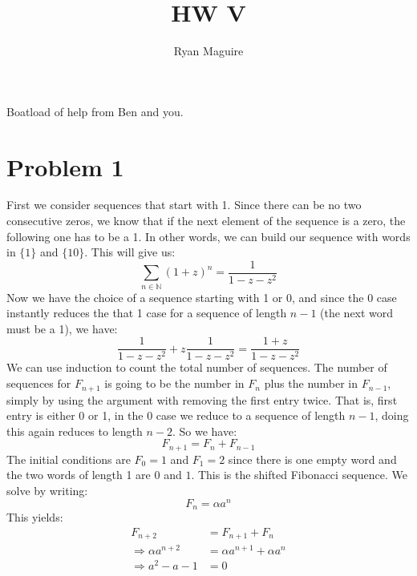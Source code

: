 \documentclass{article}
\title{HW V}
\author{Ryan Maguire}
\date{\vspace{-2ex}}
\begin{document}
    \maketitle
    Boatload of help from Ben and you.
    \section*{Problem 1}
        First we consider sequences that start with 1. Since there can be no two
        consecutive zeros, we know that if the next element of the sequence is a
        zero, the following one has to be a 1. In other words, we can build our
        sequence with words in $\{1\}$ and $\{10\}$. This will give us:
        \begin{equation}
            \sum_{n\in\mathbb{N}}(1+z)^{n}=\frac{1}{1-z-z^{2}}
        \end{equation}
        Now we have the choice of a sequence starting with 1 or 0, and since the 0 case
        instantly reduces the that 1 case for a sequence of length $n-1$ (the next word must
        be a 1), we have:
        \begin{equation}
            \frac{1}{1-z-z^{2}} + z\frac{1}{1-z-z^{2}}=\frac{1+z}{1-z-z^{2}}
        \end{equation}
        We can use induction to count the total number of sequences. The number of sequences
        for $F_{n+1}$ is going to be the number in $F_{n}$ plus the number in
        $F_{n-1}$, simply by using the argument with removing the first entry twice.
        That is, first entry is either 0 or 1, in the 0 case we reduce to a sequence of
        length $n-1$, doing this again reduces to length $n-2$. So we have:
        \begin{equation}
            F_{n+1}=F_{n}+F_{n-1}
        \end{equation}
        The initial conditions are $F_{0}=1$ and $F_{1}=2$ since there is one empty word
        and the two words of length 1 are $0$ and $1$. This is the shifted Fibonacci
        sequence. We solve by writing:
        \begin{equation}
            F_{n}=\alpha{a}^{n}
        \end{equation}
        This yields:
        \begin{subequations}
            \begin{align}
                F_{n+2}&=F_{n+1}+F_{n}\\
                \Rightarrow
                \alpha{a}^{n+2}&=\alpha{a}^{n+1}+\alpha{a}^{n}\\
                \Rightarrow
                a^{2}-a-1&=0
            \end{align}
        \end{subequations}
\end{document}
